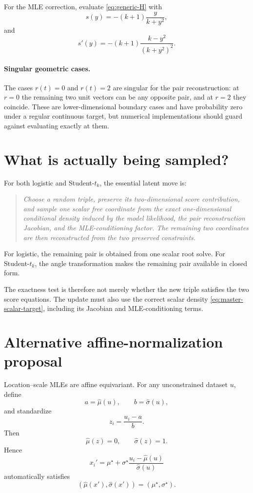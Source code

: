 \documentclass[11pt]{article}
\newcommand{\1}{\mathbf{1}}
\begin{document}
For the MLE correction, evaluate \eqref{eq:generic-H} with
\[
    s(y)=-(k+1)\frac{y}{k+y^2},
\]
and
\begin{equation}
\boxed{
    s'(y)
    =-(k+1)\frac{k-y^2}{(k+y^2)^2}.
}
\end{equation}

\paragraph{Singular geometric cases.}
The cases $r(t)=0$ and $r(t)=2$ are singular for the pair reconstruction: at $r=0$ the remaining two unit vectors can be any opposite pair, and at $r=2$ they coincide.  These are lower-dimensional boundary cases and have probability zero under a regular continuous target, but numerical implementations should guard against evaluating exactly at them.

\section{What is actually being sampled?}

For both logistic and Student-$t_k$, the essential latent move is:
\begin{quote}
\emph{Choose a random triple, preserve its two-dimensional score contribution, and sample one scalar free coordinate from the exact one-dimensional conditional density induced by the model likelihood, the pair reconstruction Jacobian, and the MLE-conditioning factor.  The remaining two coordinates are then reconstructed from the two preserved constraints.}
\end{quote}

For logistic, the remaining pair is obtained from one scalar root solve.  For Student-$t_k$, the angle transformation makes the remaining pair available in closed form.

The exactness test is therefore not merely whether the new triple satisfies the two score equations.  The update must also use the correct scalar density \eqref{eq:master-scalar-target}, including its Jacobian and MLE-conditioning terms.

\section{Alternative affine-normalization proposal}

Location--scale MLEs are affine equivariant.  For any unconstrained dataset $u$, define
\[
    a=\widehat\mu(u),
    \qquad
    b=\widehat\sigma(u),
\]
and standardize
\[
    z_i=\frac{u_i-a}{b}.
\]
Then
\[
    \widehat\mu(z)=0,
    \qquad
    \widehat\sigma(z)=1.
\]
Hence
\begin{equation}
\boxed{
    x_i'
    =\mu^\star+\sigma^\star
      \frac{u_i-\widehat\mu(u)}{\widehat\sigma(u)}
}
\end{equation}
automatically satisfies
\[
    (\widehat\mu(x'),\widehat\sigma(x'))
    =(\mu^\star,\sigma^\star).
\]
\end{document}
